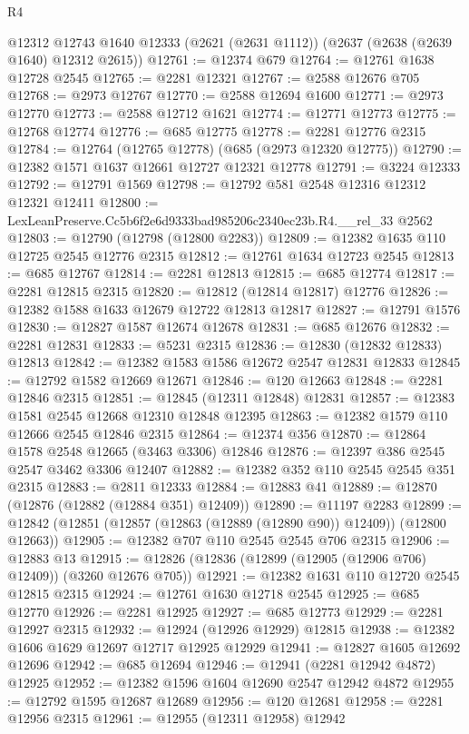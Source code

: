 \begin{lexlean}{R4}
\begin{coremodule}
    @12312
    @12743
    @1640
    @12333
    (@2621 (@2631 @1112))
    (@2637 (@2638 (@2639 @1640) @12312 @2615))
@12761 := @12374 @679
@12764 := @12761 @1638 @12728 @2545
@12765 := @2281 @12321
@12767 := @2588 @12676 @705
@12768 := @2973 @12767
@12770 := @2588 @12694 @1600
@12771 := @2973 @12770
@12773 := @2588 @12712 @1621
@12774 := @12771 @12773
@12775 := @12768 @12774
@12776 := @685 @12775
@12778 := @2281 @12776 @2315
@12784 := @12764 (@12765 @12778) (@685 (@2973 @12320 @12775))
@12790 := @12382 @1571 @1637 @12661 @12727 @12321 @12778
@12791 := @3224 @12333
@12792 := @12791 @1569
@12798 := @12792 @581 @2548 @12316 @12312 @12321 @12411
@12800 := LexLeanPreserve.Cc5b6f2e6d9333bad985206c2340ec23b.R4.__rel_33 @2562
@12803 := @12790 (@12798 (@12800 @2283))
@12809 := @12382 @1635 @110 @12725 @2545 @12776 @2315
@12812 := @12761 @1634 @12723 @2545
@12813 := @685 @12767
@12814 := @2281 @12813
@12815 := @685 @12774
@12817 := @2281 @12815 @2315
@12820 := @12812 (@12814 @12817) @12776
@12826 := @12382 @1588 @1633 @12679 @12722 @12813 @12817
@12827 := @12791 @1576
@12830 := @12827 @1587 @12674 @12678
@12831 := @685 @12676
@12832 := @2281 @12831
@12833 := @5231 @2315
@12836 := @12830 (@12832 @12833) @12813
@12842 := @12382 @1583 @1586 @12672 @2547 @12831 @12833
@12845 := @12792 @1582 @12669 @12671
@12846 := @120 @12663
@12848 := @2281 @12846 @2315
@12851 := @12845 (@12311 @12848) @12831
@12857 := @12383 @1581 @2545 @12668 @12310 @12848 @12395
@12863 := @12382 @1579 @110 @12666 @2545 @12846 @2315
@12864 := @12374 @356
@12870 := @12864 @1578 @2548 @12665 (@3463 @3306) @12846
@12876 := @12397 @386 @2545 @2547 @3462 @3306 @12407
@12882 := @12382 @352 @110 @2545 @2545 @351 @2315
@12883 := @2811 @12333
@12884 := @12883 @41
@12889 := @12870 (@12876 (@12882 (@12884 @351) @12409))
@12890 := @11197 @2283
@12899 := @12842 (@12851 (@12857 (@12863 (@12889 (@12890 @90)) @12409)) (@12800 @12663))
@12905 := @12382 @707 @110 @2545 @2545 @706 @2315
@12906 := @12883 @13
@12915 := @12826 (@12836 (@12899 (@12905 (@12906 @706) @12409)) (@3260 @12676 @705))
@12921 := @12382 @1631 @110 @12720 @2545 @12815 @2315
@12924 := @12761 @1630 @12718 @2545
@12925 := @685 @12770
@12926 := @2281 @12925
@12927 := @685 @12773
@12929 := @2281 @12927 @2315
@12932 := @12924 (@12926 @12929) @12815
@12938 := @12382 @1606 @1629 @12697 @12717 @12925 @12929
@12941 := @12827 @1605 @12692 @12696
@12942 := @685 @12694
@12946 := @12941 (@2281 @12942 @4872) @12925
@12952 := @12382 @1596 @1604 @12690 @2547 @12942 @4872
@12955 := @12792 @1595 @12687 @12689
@12956 := @120 @12681
@12958 := @2281 @12956 @2315
@12961 := @12955 (@12311 @12958) @12942

\end{coremodule}
\end{lexlean}
